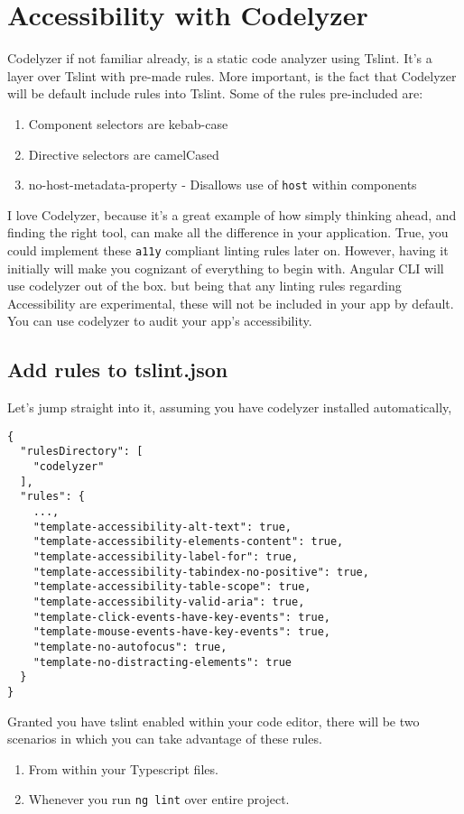 \chapter{ Accessibility with Codelyzer}    
Codelyzer if not familiar already, is a static code analyzer using Tslint. It's a layer over Tslint with pre-made rules. More important, is the fact that Codelyzer will be default include rules into Tslint. Some of the rules pre-included are: 
\begin{enumerate}
  \item Component selectors are kebab-case
  \item Directive selectors are camelCased
  \item no-host-metadata-property - Disallows use of \lstinline{host} within components
\end{enumerate}

I love Codelyzer, because it's a great example of how simply thinking ahead, and finding the right tool, can make all the difference in your application. True, you could implement these \lstinline{a11y} compliant linting rules later on. However, having it initially will make you cognizant of everything to begin with. Angular CLI will use codelyzer out of the box. but being that any linting rules regarding Accessibility are experimental, these will not be included in your app by default. You can use codelyzer to audit your app's accessibility. 

\section{Add rules to tslint.json}
Let's jump straight into it, assuming you have codelyzer installed automatically,
\begin{lstlisting}
{
  "rulesDirectory": [
    "codelyzer"
  ],
  "rules": {
    ...,
    "template-accessibility-alt-text": true,
    "template-accessibility-elements-content": true,
    "template-accessibility-label-for": true,
    "template-accessibility-tabindex-no-positive": true,
    "template-accessibility-table-scope": true,
    "template-accessibility-valid-aria": true,
    "template-click-events-have-key-events": true,
    "template-mouse-events-have-key-events": true,
    "template-no-autofocus": true,
    "template-no-distracting-elements": true
  }
}  
\end{lstlisting}

Granted you have tslint enabled within your code editor, there will be two scenarios in which you can take advantage of these rules. 
\begin{enumerate}
  \item From within your Typescript files.
  \item Whenever you run \lstinline{ng lint} over entire project.
\end{enumerate}